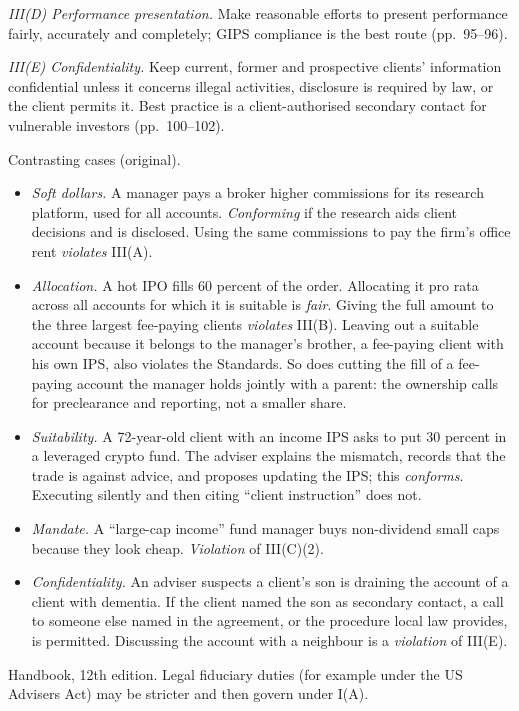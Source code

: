 \begin{qfrule}
\emph{III(D) Performance presentation.} Make reasonable efforts to present performance fairly, accurately and completely; GIPS compliance is the best route (pp.~95--96).

\emph{III(E) Confidentiality.} Keep current, former and prospective clients' information confidential unless it concerns illegal activities, disclosure is required by law, or the client permits it. Best practice is a client-authorised secondary contact for vulnerable investors (pp.~100--102).

 Contrasting cases (original).
\begin{itemize}
\item \emph{Soft dollars.} A manager pays a broker higher commissions for its research platform, used for all accounts. \emph{Conforming} if the research aids client decisions and is disclosed. Using the same commissions to pay the firm's office rent \emph{violates} III(A).
\item \emph{Allocation.} A hot IPO fills 60 percent of the order. Allocating it pro rata across all accounts for which it is suitable is \emph{fair}. Giving the full amount to the three largest fee-paying clients \emph{violates} III(B). Leaving out a suitable account because it belongs to the manager's brother, a fee-paying client with his own IPS, also violates the Standards. So does cutting the fill of a fee-paying account the manager holds jointly with a parent: the ownership calls for preclearance and reporting, not a smaller share.
\item \emph{Suitability.} A 72-year-old client with an income IPS asks to put 30 percent in a leveraged crypto fund. The adviser explains the mismatch, records that the trade is against advice, and proposes updating the IPS; this \emph{conforms}. Executing silently and then citing ``client instruction'' does not.
\item \emph{Mandate.} A ``large-cap income'' fund manager buys non-dividend small caps because they look cheap. \emph{Violation} of III(C)(2).
\item \emph{Confidentiality.} An adviser suspects a client's son is draining the account of a client with dementia. If the client named the son as secondary contact, a call to someone else named in the agreement, or the procedure local law provides, is permitted. Discussing the account with a neighbour is a \emph{violation} of III(E).
\end{itemize}

 Handbook, 12th edition. Legal fiduciary duties (for example under the US Advisers Act) may be stricter and then govern under I(A).


\end{qfrule}
